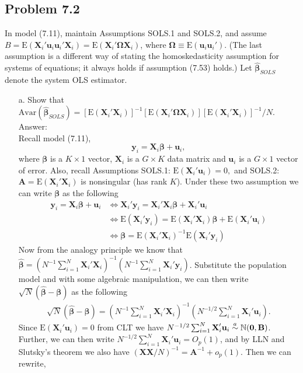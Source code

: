 \documentclass[10pt]{article}
\newcommand\asym{\stackrel{\mathclap{a}}{\sim}}
\newcommand{\N}{\mathbb{N}}
\newcommand{\E}{\text{E}}
\newcommand{\Av}{\text{Avar}}
\begin{document}
\subsection*{Problem 7.2}
In model (7.11), maintain Assumptions SOLS.1 and SOLS.2, and assume $\textbf{}B=\E(\textbf{X}_i'\textbf{u}_i\textbf{u}_i'\textbf{X}_i)=\E(\textbf{X}_i'\pmb{\Omega}\textbf{X}_i)$, where $\pmb{\Omega}\equiv \E(\textbf{u}_i\textbf{u}_i').$ (The last assumption is a different way of stating the homoskedasticity assumption for systems of equations; it always holds if assumption (7.53) holds.) Let $\hat{\pmb{\beta}}_{SOLS}$ denote the system OLS estimator.
\begin{enumerate}
\item[a.] Show that $\Av(\hat{\pmb{\beta}}_{SOLS})=[\E(\textbf{X}_i'\textbf{X}_i)]^{-1}[\E(\textbf{X}_i'\pmb{\Omega}\textbf{X}_i)][\E(\textbf{X}_i'\textbf{X}_i)]^{-1}/N.$
\\ Answer:\\
Recall model (7.11),
\[\textbf{y}_i=\textbf{X}_i\pmb{\beta}+\textbf{u}_i,\]
where $\pmb{\beta}$ is a $K\times 1$ vector, $\textbf{X}_i$ is a $G\times K$ data matrix and $\textbf{u}_i$ is a $G\times 1$ vector of error. Also, recall Assumptions SOLS.1: $\E(\textbf{X}_i'\textbf{u}_i)=0,$ and SOLS.2: $\textbf{A}=\E(\textbf{X}_i'\textbf{X}_i)$ is nonsingular (has rank $K$). Under these two assumption we can write $\pmb{\beta}$ as the following
\begin{align*}
    \textbf{y}_i=\textbf{X}_i\pmb{\beta}+\textbf{u}_i &\Leftrightarrow \textbf{X}_i'\textbf{y}_i=\textbf{X}_i'\textbf{X}_i\pmb{\beta}+\textbf{X}_i'\textbf{u}_i \\
    &\Leftrightarrow \E( \textbf{X}_i'\textbf{y}_i)=\E(\textbf{X}_i'\textbf{X}_i)\pmb{\beta}+\E(\textbf{X}_i'\textbf{u}_i) \\
    &\Leftrightarrow \pmb{\beta}=\E(\textbf{X}_i'\textbf{X}_i)^{-1}\E( \textbf{X}_i'\textbf{y}_i)
\end{align*}
Now from the analogy principle we know that $\hat{\pmb{\beta}}=(N^{-1}\sum_{i=1}^N \textbf{X}_i'\textbf{X}_i)^{-1}(N^{-1}\sum_{i=1}^N \textbf{X}_i'\textbf{y}_i)$. Substitute the population model and with some algebraic manipulation, we can then write $\sqrt{N}(\hat{\pmb{\beta}}-\pmb{\beta})$ as the following
\begin{align*}
    \sqrt{N}(\hat{\pmb{\beta}}-\pmb{\beta})=(N^{-1}\sum_{i=1}^N \textbf{X}_i'\textbf{X}_i)^{-1}(N^{-1/2}\sum_{i=1}^N \textbf{X}_i'\textbf{u}_i).
\end{align*}
Since $\E(\textbf{X}_i'\textbf{u}_i)=0$ from CLT we have $N^{-1/2}\sum_{i=1}^N \textbf{X}_i'\textbf{u}_i\asym \N(\textbf{0},\textbf{B})$. Further, we can then write $N^{-1/2}\sum_{i=1}^N \textbf{X}_i'\textbf{u}_i=O_p(1)$, and by LLN and Slutsky's theorem we also have $(\textbf{X}\textbf{X}/N)^{-1}=\textbf{A}^{-1}+o_p(1).$ Then we can rewrite,

\end{enumerate}
\end{document}
